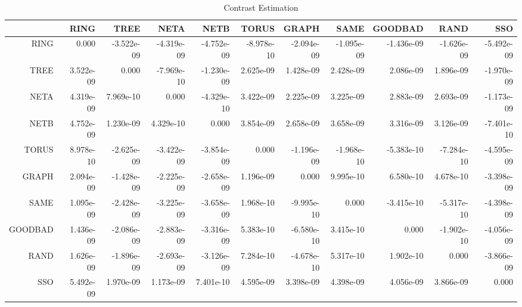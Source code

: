 \documentclass[a4paper,10pt]{article}
\begin{document}
\begin{landscape}
\begin{table}[!htp]
\centering\tiny
\caption{Contrast Estimation}
\begin{tabular}{
|r|r|r|r|r|r|r|r|r|r|r|}
\hline
 & RING& TREE& NETA& NETB& TORUS& GRAPH& SAME& GOODBAD& RAND& SSO\\
\hline
 RING&0.000&-3.522e-09&-4.319e-09&-4.752e-09&-8.978e-10&-2.094e-09&-1.095e-09&-1.436e-09&-1.626e-09&-5.492e-09\\
\hline
 TREE&3.522e-09&0.000&-7.969e-10&-1.230e-09&2.625e-09&1.428e-09&2.428e-09&2.086e-09&1.896e-09&-1.970e-09\\
\hline
 NETA&4.319e-09&7.969e-10&0.000&-4.329e-10&3.422e-09&2.225e-09&3.225e-09&2.883e-09&2.693e-09&-1.173e-09\\
\hline
 NETB&4.752e-09&1.230e-09&4.329e-10&0.000&3.854e-09&2.658e-09&3.658e-09&3.316e-09&3.126e-09&-7.401e-10\\
\hline
 TORUS&8.978e-10&-2.625e-09&-3.422e-09&-3.854e-09&0.000&-1.196e-09&-1.968e-10&-5.383e-10&-7.284e-10&-4.595e-09\\
\hline
 GRAPH&2.094e-09&-1.428e-09&-2.225e-09&-2.658e-09&1.196e-09&0.000&9.995e-10&6.580e-10&4.678e-10&-3.398e-09\\
\hline
 SAME&1.095e-09&-2.428e-09&-3.225e-09&-3.658e-09&1.968e-10&-9.995e-10&0.000&-3.415e-10&-5.317e-10&-4.398e-09\\
\hline
 GOODBAD&1.436e-09&-2.086e-09&-2.883e-09&-3.316e-09&5.383e-10&-6.580e-10&3.415e-10&0.000&-1.902e-10&-4.056e-09\\
\hline
 RAND&1.626e-09&-1.896e-09&-2.693e-09&-3.126e-09&7.284e-10&-4.678e-10&5.317e-10&1.902e-10&0.000&-3.866e-09\\
\hline
 SSO&5.492e-09&1.970e-09&1.173e-09&7.401e-10&4.595e-09&3.398e-09&4.398e-09&4.056e-09&3.866e-09&0.000\\
\hline

\end{tabular}
\end{table}

\newpage


\end{landscape}
\end{document}
